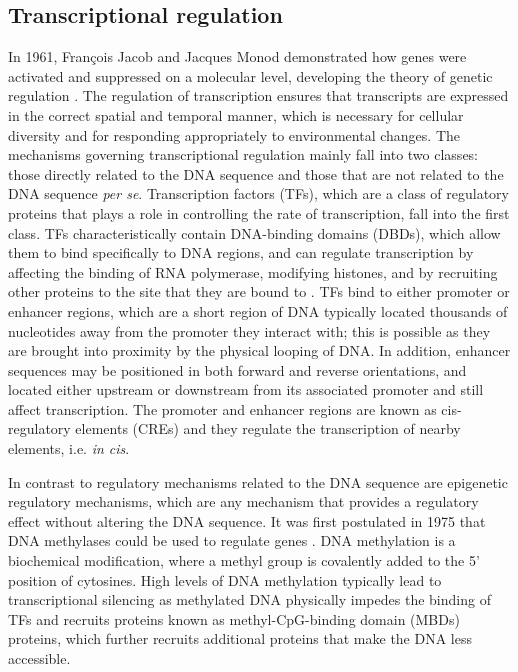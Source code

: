 \subsection{Transcriptional regulation}

In 1961, François Jacob and Jacques Monod demonstrated how genes were activated and suppressed on a molecular level, developing the theory of genetic regulation \citep{pmid13718526}. The regulation of transcription ensures that transcripts are expressed in the correct spatial and temporal manner, which is necessary for cellular diversity and for responding appropriately to environmental changes. The mechanisms governing transcriptional regulation mainly fall into two classes: those directly related to the DNA sequence and those that are not related to the DNA sequence \textit{per se}. Transcription factors (TFs), which are a class of regulatory proteins that plays a role in controlling the rate of transcription, fall into the first class. TFs characteristically contain DNA-binding domains (DBDs), which allow them to bind specifically to DNA regions, and can regulate transcription by affecting the binding of RNA polymerase, modifying histones, and by recruiting other proteins to the site that they are bound to \citep{pmid11092823}. TFs bind to either promoter or enhancer regions, which are a short region of DNA typically located thousands of nucleotides away from the promoter they interact with; this is possible as they are brought into proximity by the physical looping of DNA. In addition, enhancer sequences may be positioned in both forward and reverse orientations, and located either upstream or downstream from its associated promoter and still affect transcription. The promoter and enhancer regions are known as cis-regulatory elements (CREs) and they regulate the transcription of nearby elements, i.e. \textit{in cis}.

In contrast to regulatory mechanisms related to the DNA sequence are epigenetic regulatory mechanisms, which are any mechanism that provides a regulatory effect without altering the DNA sequence. It was first postulated in 1975 that DNA methylases could be used to regulate genes \citep{pmid1093816, pmid1111098}. DNA methylation is a biochemical modification, where a methyl group is covalently added to the 5' position of cytosines. High levels of DNA methylation typically lead to transcriptional silencing as methylated DNA physically impedes the binding of TFs and recruits proteins known as methyl-CpG-binding domain (MBDs) proteins, which further recruits additional proteins that make the DNA less accessible.

